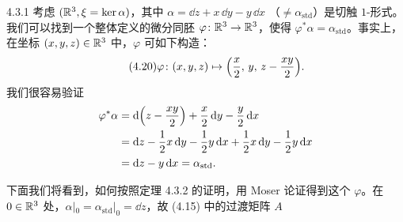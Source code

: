\begin{wexam}{4.3.1}
  考虑 $(\mathbb{R}^3,\xi=\ker\alpha)$，其中 $\alpha=\dd z+x\,\dd y-y\,\dd x$
  （$\neq\alpha_{\mathrm{std}}$）是切触 $1$-形式。我们可以找到一个整体定义的微分同胚
  $\varphi\colon\mathbb{R}^3\to\mathbb{R}^3$，使得 $\varphi^*\alpha=\alpha_{\mathrm{std}}$。事实上，
  在坐标 $(x,y,z)\in\mathbb{R}^3$ 中，$\varphi$ 可如下构造：
  \begin{equation}\tag{4.20}
    \varphi\colon(x,y,z)\mapsto\Bigl(\frac x2,\,y,\,z-\frac{xy}2\Bigr).
  \end{equation}
  我们很容易验证
  \begin{equation*}
    \begin{aligned}
      \varphi^*\alpha
      &=\mathrm{d}\Bigl(z-\frac{xy}2\Bigr)+\frac x2\,\mathrm{d} y-\frac y2\,\mathrm{d} x\\
      &=\mathrm{d} z-\frac12x\,\mathrm{d} y-\frac12y\,\mathrm{d} x+\frac12x\,\mathrm{d} y-\frac12y\,\mathrm{d} x\\
      &=\mathrm{d} z-y\,\mathrm{d} x=\alpha_{\mathrm{std}}.
    \end{aligned}
  \end{equation*}

  下面我们将看到，如何按照定理 4.3.2 的证明，用 Moser 论证得到这个 $\varphi$。在
  $0\in\mathbb{R}^3$ 处，$\alpha|_0=\alpha_{\mathrm{std}}|_0=\dd z$，故 (4.15) 中的过渡矩阵 $A$


\end{wexam}
